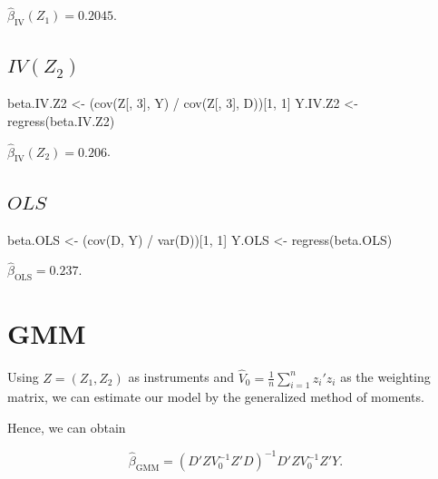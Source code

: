 \documentclass[9pt,twocolumn,twoside,]{pnas-new}
\newenvironment{Shaded}{}{}
\newcommand{\DecValTok}[1]{\textcolor[rgb]{0.25,0.63,0.44}{#1}}
\newcommand{\FunctionTok}[1]{\textcolor[rgb]{0.02,0.16,0.49}{#1}}
\newcommand{\NormalTok}[1]{#1}
\newcommand{\OtherTok}[1]{\textcolor[rgb]{0.00,0.44,0.13}{#1}}
\newcommand{\SpecialCharTok}[1]{\textcolor[rgb]{0.25,0.44,0.63}{#1}}
\begin{document}
\(\hat{\beta}_{\text{IV}} (Z_1) = 0.2045\).

\hypertarget{ivz_2}{%
\subsection{\texorpdfstring{\(IV(Z_2)\)}{IV(Z\_2)}}\label{ivz_2}}

\begin{Shaded}
\begin{Highlighting}[]
\NormalTok{beta.IV.Z2 }\OtherTok{\textless{}{-}}\NormalTok{ (}\FunctionTok{cov}\NormalTok{(Z[, }\DecValTok{3}\NormalTok{], Y) }\SpecialCharTok{/} \FunctionTok{cov}\NormalTok{(Z[, }\DecValTok{3}\NormalTok{], D))[}\DecValTok{1}\NormalTok{, }\DecValTok{1}\NormalTok{]}
\NormalTok{Y.IV.Z2 }\OtherTok{\textless{}{-}} \FunctionTok{regress}\NormalTok{(beta.IV.Z2)}
\end{Highlighting}
\end{Shaded}

\(\hat{\beta}_{\text{IV}} (Z_2) = 0.206\).

\hypertarget{ols}{%
\subsection{\texorpdfstring{\(OLS\)}{OLS}}\label{ols}}

\begin{Shaded}
\begin{Highlighting}[]
\NormalTok{beta.OLS }\OtherTok{\textless{}{-}}\NormalTok{ (}\FunctionTok{cov}\NormalTok{(D, Y) }\SpecialCharTok{/} \FunctionTok{var}\NormalTok{(D))[}\DecValTok{1}\NormalTok{, }\DecValTok{1}\NormalTok{]}
\NormalTok{Y.OLS }\OtherTok{\textless{}{-}} \FunctionTok{regress}\NormalTok{(beta.OLS)}
\end{Highlighting}
\end{Shaded}

\(\hat{\beta}_{\text{OLS}} = 0.237\).

\hypertarget{gmm}{%
\section{GMM}\label{gmm}}

Using \(Z = (Z_1, Z_2)\) as instruments and
\(\displaystyle \hat{V}_0 = \frac{1}{n} \sum_{i = 1}^n z_i' z_i\) as the
weighting matrix, we can estimate our model by the generalized method of
moments.

Hence, we can obtain

\[
\hat{\beta}_{\text{GMM}} = \left( D' Z V_0^{-1} Z' D \right)^{-1} D' Z V_0^{-1} Z' Y.
\]
\end{document}
